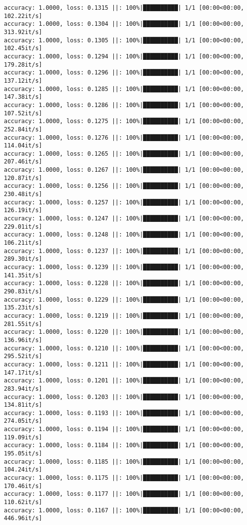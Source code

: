\documentclass[
]{article}
\begin{document}
\begin{verbatim}
accuracy: 1.0000, loss: 0.1315 ||: 100%|██████████| 1/1 [00:00<00:00, 102.22it/s]
accuracy: 1.0000, loss: 0.1304 ||: 100%|██████████| 1/1 [00:00<00:00, 313.92it/s]
accuracy: 1.0000, loss: 0.1305 ||: 100%|██████████| 1/1 [00:00<00:00, 102.45it/s]
accuracy: 1.0000, loss: 0.1294 ||: 100%|██████████| 1/1 [00:00<00:00, 179.28it/s]
accuracy: 1.0000, loss: 0.1296 ||: 100%|██████████| 1/1 [00:00<00:00, 137.12it/s]
accuracy: 1.0000, loss: 0.1285 ||: 100%|██████████| 1/1 [00:00<00:00, 147.38it/s]
accuracy: 1.0000, loss: 0.1286 ||: 100%|██████████| 1/1 [00:00<00:00, 107.52it/s]
accuracy: 1.0000, loss: 0.1275 ||: 100%|██████████| 1/1 [00:00<00:00, 252.84it/s]
accuracy: 1.0000, loss: 0.1276 ||: 100%|██████████| 1/1 [00:00<00:00, 114.04it/s]
accuracy: 1.0000, loss: 0.1265 ||: 100%|██████████| 1/1 [00:00<00:00, 207.46it/s]
accuracy: 1.0000, loss: 0.1267 ||: 100%|██████████| 1/1 [00:00<00:00, 120.87it/s]
accuracy: 1.0000, loss: 0.1256 ||: 100%|██████████| 1/1 [00:00<00:00, 230.48it/s]
accuracy: 1.0000, loss: 0.1257 ||: 100%|██████████| 1/1 [00:00<00:00, 126.19it/s]
accuracy: 1.0000, loss: 0.1247 ||: 100%|██████████| 1/1 [00:00<00:00, 229.01it/s]
accuracy: 1.0000, loss: 0.1248 ||: 100%|██████████| 1/1 [00:00<00:00, 106.21it/s]
accuracy: 1.0000, loss: 0.1237 ||: 100%|██████████| 1/1 [00:00<00:00, 289.30it/s]
accuracy: 1.0000, loss: 0.1239 ||: 100%|██████████| 1/1 [00:00<00:00, 141.35it/s]
accuracy: 1.0000, loss: 0.1228 ||: 100%|██████████| 1/1 [00:00<00:00, 290.83it/s]
accuracy: 1.0000, loss: 0.1229 ||: 100%|██████████| 1/1 [00:00<00:00, 135.23it/s]
accuracy: 1.0000, loss: 0.1219 ||: 100%|██████████| 1/1 [00:00<00:00, 281.55it/s]
accuracy: 1.0000, loss: 0.1220 ||: 100%|██████████| 1/1 [00:00<00:00, 136.96it/s]
accuracy: 1.0000, loss: 0.1210 ||: 100%|██████████| 1/1 [00:00<00:00, 295.52it/s]
accuracy: 1.0000, loss: 0.1211 ||: 100%|██████████| 1/1 [00:00<00:00, 147.17it/s]
accuracy: 1.0000, loss: 0.1201 ||: 100%|██████████| 1/1 [00:00<00:00, 283.94it/s]
accuracy: 1.0000, loss: 0.1203 ||: 100%|██████████| 1/1 [00:00<00:00, 134.81it/s]
accuracy: 1.0000, loss: 0.1193 ||: 100%|██████████| 1/1 [00:00<00:00, 274.05it/s]
accuracy: 1.0000, loss: 0.1194 ||: 100%|██████████| 1/1 [00:00<00:00, 119.09it/s]
accuracy: 1.0000, loss: 0.1184 ||: 100%|██████████| 1/1 [00:00<00:00, 195.05it/s]
accuracy: 1.0000, loss: 0.1185 ||: 100%|██████████| 1/1 [00:00<00:00, 104.24it/s]
accuracy: 1.0000, loss: 0.1175 ||: 100%|██████████| 1/1 [00:00<00:00, 170.46it/s]
accuracy: 1.0000, loss: 0.1177 ||: 100%|██████████| 1/1 [00:00<00:00, 110.62it/s]
accuracy: 1.0000, loss: 0.1167 ||: 100%|██████████| 1/1 [00:00<00:00, 446.96it/s]

\end{verbatim}
\end{document}
